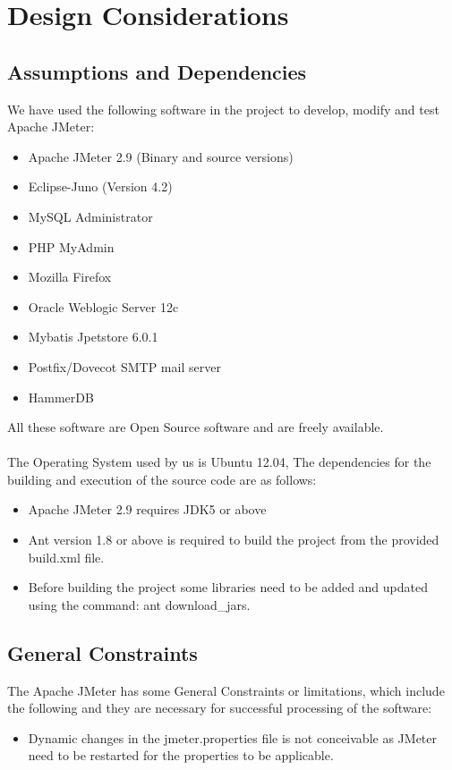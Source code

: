 \documentclass[12pt]{book}
\begin{document}
\chapter{Design Considerations}

\section{Assumptions and Dependencies}
We have used the following software in the project to develop, modify and test Apache JMeter:
\begin{itemize}
 \item Apache JMeter 2.9 (Binary and source versions)
 \item Eclipse-Juno (Version 4.2)
 \item MySQL Administrator
 \item PHP MyAdmin
 \item Mozilla Firefox
 \item Oracle Weblogic Server 12c
 \item Mybatis Jpetstore 6.0.1
 \item Postfix/Dovecot SMTP mail server
 \item HammerDB
\end{itemize}

All these software are Open Source software and are freely available.\\
\\
The Operating System used by us is Ubuntu 12.04, The dependencies for the building and
execution of the source code are as follows:
\begin{itemize}
 \item Apache JMeter 2.9 requires JDK5 or above
 \item Ant version 1.8 or above is required to build the project from the provided build.xml file.
 \item Before building the project some libraries need to be added and updated using the command: ant download\_jars.
\end{itemize}

\section{General Constraints}
The Apache JMeter has some General Constraints or limitations, which include the following and
they are necessary for successful processing of the software:
\begin{itemize}
 \item Dynamic changes in the jmeter.properties file is not conceivable as JMeter need to be
restarted for the properties to be applicable.
\end{itemize}
\end{document}
